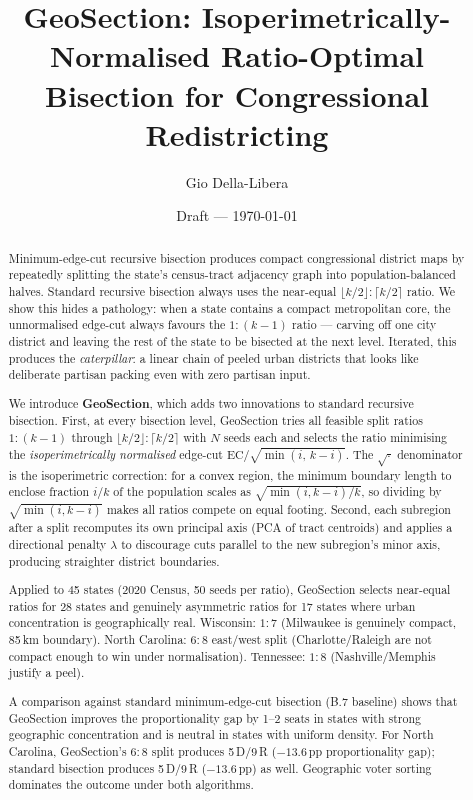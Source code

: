 \documentclass[12pt]{article}
\title{GeoSection: Isoperimetrically-Normalised Ratio-Optimal\\
       Bisection for Congressional Redistricting}
\author{Gio Della-Libera}
\date{Draft --- \today}
\begin{document}
\maketitle

\begin{abstract}
Minimum-edge-cut recursive bisection produces compact congressional district maps
by repeatedly splitting the state's census-tract adjacency graph into
population-balanced halves.
Standard recursive bisection always uses the near-equal $\lfloor k/2\rfloor:\lceil k/2\rceil$ ratio.
We show this hides a pathology: when a state contains a compact metropolitan
core, the unnormalised edge-cut always favours the $1:(k-1)$ ratio
--- carving off one city district and leaving the rest of the state
to be bisected at the next level.
Iterated, this produces the \emph{caterpillar}: a linear chain of peeled
urban districts that looks like deliberate partisan packing even with
zero partisan input.

We introduce \textbf{GeoSection}, which adds two innovations to standard
recursive bisection.
First, at every bisection level, GeoSection tries all feasible split ratios
$1:(k-1)$ through $\lfloor k/2\rfloor:\lceil k/2\rceil$ with $N$ seeds each
and selects the ratio minimising the \emph{isoperimetrically normalised}
edge-cut $\mathrm{EC}/\sqrt{\min(i,\,k-i)}$.
The $\sqrt{\cdot}$ denominator is the isoperimetric correction: for a convex region,
the minimum boundary length to enclose fraction $i/k$ of the population
scales as $\sqrt{\min(i,k-i)/k}$, so dividing by $\sqrt{\min(i,k-i)}$
makes all ratios compete on equal footing.
Second, each subregion after a split recomputes its own principal axis
(PCA of tract centroids) and applies a directional penalty $\lambda$
to discourage cuts parallel to the new subregion's minor axis,
producing straighter district boundaries.

Applied to 45 states (2020 Census, 50 seeds per ratio), GeoSection
selects near-equal ratios for 28 states and genuinely asymmetric ratios
for 17 states where urban concentration is geographically real.
Wisconsin: $1:7$ (Milwaukee is genuinely compact, 85\,km boundary).
North Carolina: $6:8$ east/west split (Charlotte/Raleigh are not
compact enough to win under normalisation).
Tennessee: $1:8$ (Nashville/Memphis justify a peel).

A comparison against standard minimum-edge-cut bisection (B.7 baseline)
shows that GeoSection improves the proportionality gap by 1--2 seats in
states with strong geographic concentration and is neutral in states
with uniform density.
For North Carolina, GeoSection's $6:8$ split produces 5\,D/9\,R
($-13.6$\,pp proportionality gap); standard bisection produces 5\,D/9\,R
($-13.6$\,pp) as well.
Geographic voter sorting dominates the outcome under both algorithms.
\end{abstract}










\end{document}
